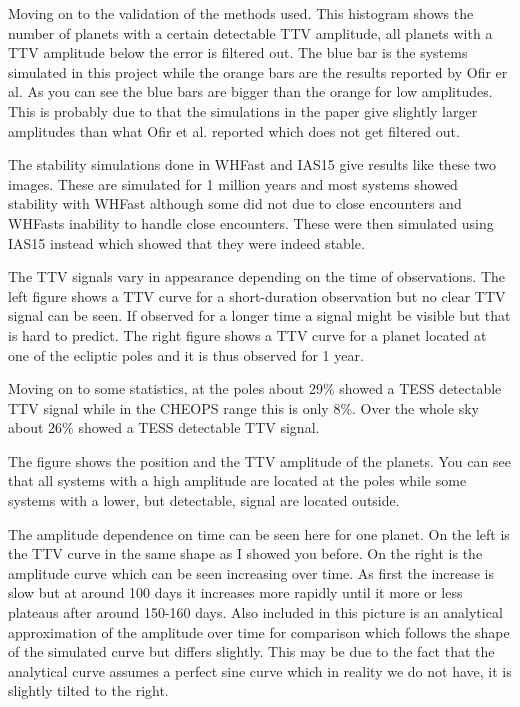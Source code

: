 \documentclass[12pt]{report}
\begin{document}
	Moving on to the validation of the methods used. This histogram shows the number of planets with a certain detectable TTV amplitude, all planets with a TTV amplitude below the error is filtered out. The blue bar is the systems simulated in this project while the orange bars are the results reported by Ofir er al. As you can see the blue bars are bigger than the orange for low amplitudes. This is probably due to that the simulations in the paper give slightly larger amplitudes than what Ofir et al. reported which does not get filtered out.
	
	The stability simulations done in WHFast and IAS15 give results like these two images. These are simulated for 1 million years and most systems showed stability with WHFast although some did not due to close encounters and WHFasts inability to handle close encounters. These were then simulated using IAS15 instead which showed that they were indeed stable.
	
	The TTV signals vary in appearance depending on the time of observations. The left figure shows a TTV curve for a short-duration observation but no clear TTV signal can be seen. If observed for a longer time a signal might be visible but that is hard to predict. The right figure shows a TTV curve for a planet located at one of the ecliptic poles and it is thus observed for 1 year.
	
	Moving on to some statistics, at the poles about 29\% showed a TESS detectable TTV signal while in the CHEOPS range this is only 8\%. Over the whole sky about 26\% showed a TESS detectable TTV signal.
	
	The figure shows the position and the TTV amplitude of the planets. You can see that all systems with a high amplitude are located at the poles while some systems with a lower, but detectable, signal are located outside.
	
	The amplitude dependence on time can be seen here for one planet. On the left is the TTV curve in the same shape as I showed you before. On the right is the amplitude curve which can be seen increasing over time. As first the increase is slow but at around 100 days it increases more rapidly until it more or less plateaus after around 150-160 days. Also included in this picture is an analytical approximation of the amplitude over time for comparison which follows the shape of the simulated curve but differs slightly. This may be due to the fact that the analytical curve assumes a perfect sine curve which in reality we do not have, it is slightly tilted to the right.
	
\end{document}
